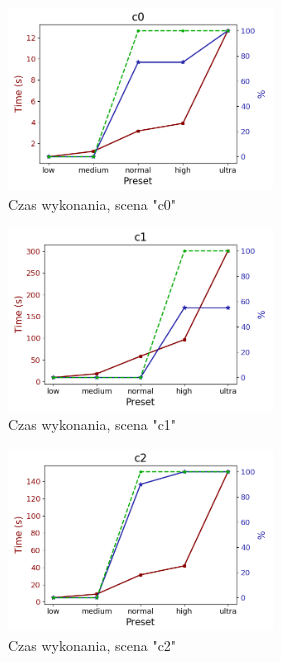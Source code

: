 

\begin{figure}[h]
   \centering
   \includegraphics[width=7cm]{measure/c0.png}
   \caption{Czas wykonania, scena "c0"}
   \label {fig:measure_c0}
\end{figure}
\begin{figure}[h]
   \centering
   \includegraphics[width=7cm]{measure/c1.png}
   \caption{Czas wykonania, scena "c1"}
   \label {fig:measure_c1}
\end{figure}
\begin{figure}[h]
   \centering
   \includegraphics[width=7cm]{measure/c2.png}
   \caption{Czas wykonania, scena "c2"}
   \label {fig:measure_c2}
\end{figure}
